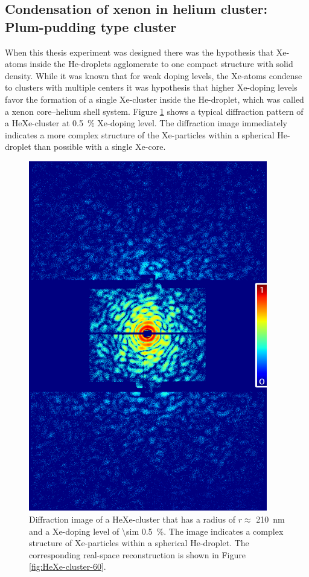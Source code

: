 \subsection{Condensation of xenon in helium cluster: Plum-pudding type cluster}\label{sec:helium-data}
%
When this thesis experiment was designed there was the hypothesis that Xe-atoms inside the He-droplets agglomerate to one compact structure with solid density. While it was known that for weak doping levels, the Xe-atoms condense to clusters with multiple centers \cite{Loginov-2011-PRL,Gomez-2014-Science} it was hypothesis that higher Xe-doping levels favor the formation of a single Xe-cluster inside the He-droplet, which was called a xenon core--helium shell system. Figure \ref{fig:HeXe-cluster-diff-patttern} shows a typical diffraction pattern of a HeXe-cluster at \SI{0.5}{\percent} Xe-doping level. The diffraction image immediately indicates a more complex structure of the Xe-particles within a spherical He-droplet than possible with a single Xe-core.
%
\begin{figure}
 	\centering
 		\includegraphics[width=0.93\textwidth]{images/results/HeXediffPattern-113-05-doping-diffpattern2.png}
 	\caption[Diffraction image of HeXe-cluster at \SI{0.5}{\percent} Xe-doping.]{Diffraction image of a HeXe-cluster that has a radius of $r\approx$ \SI{210}{\nano\meter} and a Xe-doping level of \SI{\sim 0.5}{\percent}. The image indicates a complex structure of Xe-particles within a spherical He-droplet. The corresponding real-space reconstruction is shown in Figure \ref{fig:HeXe-cluster-60}.}
 	\label{fig:HeXe-cluster-diff-patttern}
\end{figure}
